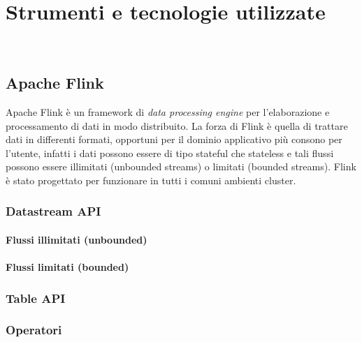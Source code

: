 
\chapter{Strumenti e tecnologie utilizzate}
\label{cap:strumenti-tecnologie}


\\

\section{Apache Flink}
Apache Flink è un \gls{framework} di \textit{data processing engine} per l'elaborazione e processamento di dati in modo distribuito.
La forza di Flink è quella di trattare dati in differenti formati, opportuni per il dominio applicativo più consono per l'utente, infatti i dati possono essere di tipo \gls{stateful} che \gls{stateless} e tali flussi possono essere illimitati (\gls{unbounded streams}) o limitati (\gls{bounded streams}). Flink è stato progettato per funzionare in tutti i comuni ambienti \gls{cluster}.

\subsection{Datastream API}
	\subsubsection{Flussi illimitati (unbounded)}
	\subsubsection{Flussi limitati (bounded)}

\subsection{Table API}

	\subsection{Operatori}
